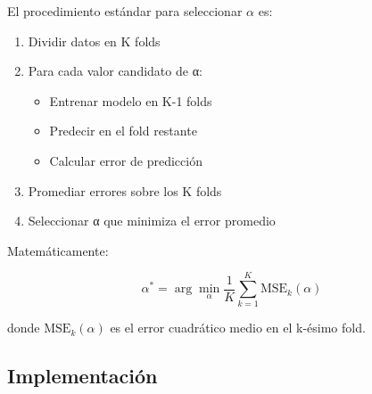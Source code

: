\documentclass[
  doc,
  floatsintext,
  longtable,
  a4paper,
  nolmodern,
  notxfonts,
  notimes,
  12pt,
  colorlinks=true,linkcolor=blue,citecolor=blue,urlcolor=blue]{apa7}
\providecommand{\tightlist}{%
  \setlength{\itemsep}{0pt}\setlength{\parskip}{0pt}}
\begin{document}
El procedimiento estándar para seleccionar \(\alpha\) es:

\begin{enumerate}
\def\labelenumi{\arabic{enumi}.}
\tightlist
\item
  Dividir datos en K folds
\item
  Para cada valor candidato de α:

  \begin{itemize}
  \tightlist
  \item
    Entrenar modelo en K-1 folds
  \item
    Predecir en el fold restante
  \item
    Calcular error de predicción
  \end{itemize}
\item
  Promediar errores sobre los K folds
\item
  Seleccionar α que minimiza el error promedio
\end{enumerate}

Matemáticamente:

\[
\alpha^* = \arg\min_{\alpha} \frac{1}{K} \sum_{k=1}^{K} \text{MSE}_k(\alpha)
\]

donde \(\text{MSE}_k(\alpha)\) es el error cuadrático medio en el
k-ésimo fold.

\subsection{Implementación}\label{implementaciuxf3n-1}
\end{document}
